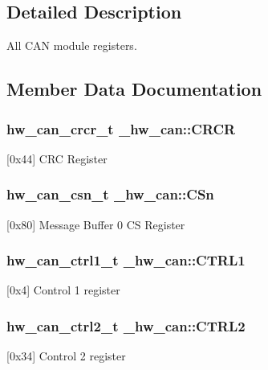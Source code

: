 \subsection{Detailed Description}
All C\+AN module registers. 

\subsection{Member Data Documentation}
\subsubsection[{\texorpdfstring{C\+R\+CR}{CRCR}}]{ {\bf hw\+\_\+can\+\_\+crcr\+\_\+t} \+\_\+hw\+\_\+can\+::\+C\+R\+CR}\hypertarget{struct__hw__can_aa523567824c5b0b939c869d1c07b93fd}{}\label{struct__hw__can_aa523567824c5b0b939c869d1c07b93fd}
\mbox{[}0x44\mbox{]} C\+RC Register 
\subsubsection[{\texorpdfstring{C\+Sn}{CSn}}]{ {\bf hw\+\_\+can\+\_\+csn\+\_\+t} \+\_\+hw\+\_\+can\+::\+C\+Sn}\hypertarget{struct__hw__can_adb20132822bcc9bad6b15d73e43076fd}{}\label{struct__hw__can_adb20132822bcc9bad6b15d73e43076fd}
\mbox{[}0x80\mbox{]} Message Buffer 0 CS Register 
\subsubsection[{\texorpdfstring{C\+T\+R\+L1}{CTRL1}}]{ {\bf hw\+\_\+can\+\_\+ctrl1\+\_\+t} \+\_\+hw\+\_\+can\+::\+C\+T\+R\+L1}\hypertarget{struct__hw__can_a56cf068b5255a3eafc149c71fe764b2e}{}\label{struct__hw__can_a56cf068b5255a3eafc149c71fe764b2e}
\mbox{[}0x4\mbox{]} Control 1 register 
\subsubsection[{\texorpdfstring{C\+T\+R\+L2}{CTRL2}}]{ {\bf hw\+\_\+can\+\_\+ctrl2\+\_\+t} \+\_\+hw\+\_\+can\+::\+C\+T\+R\+L2}\hypertarget{struct__hw__can_a75afb62975bf4676b4a96e33ba3c5482}{}\label{struct__hw__can_a75afb62975bf4676b4a96e33ba3c5482}
\mbox{[}0x34\mbox{]} Control 2 register 
